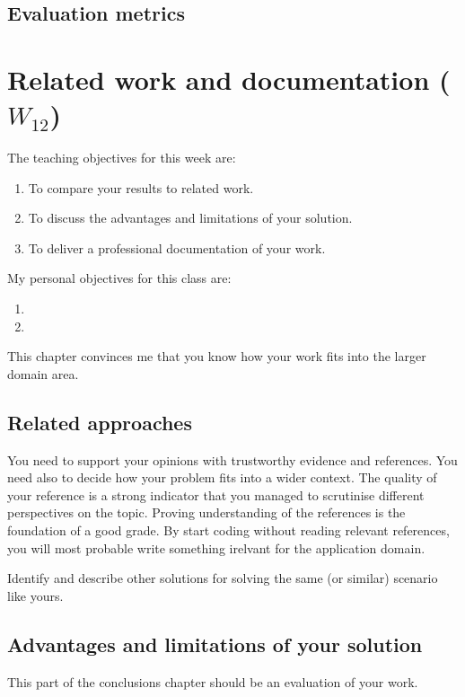 \documentclass[a4paper,12pt]{report}
\begin{document}
\section{Evaluation metrics}



\chapter{Related work and documentation ($W_{12}$)}

The teaching objectives for this week are:
\begin{enumerate}
 \item To compare your results to related work.
\item To discuss the advantages and limitations of your solution.
\item To deliver a professional documentation of your work.
\end{enumerate}

\vspace{0.5cm}

My personal objectives for this class are:
\begin{enumerate}
 \item 
 \item 
\end{enumerate}


This chapter convinces me that you know how your work fits into the larger domain area.



\section{Related approaches}
You need to support your opinions with trustworthy evidence and references.
You need also to decide how your problem fits into a wider context.
The quality of your reference is a strong indicator that you 
managed to scrutinise different perspectives on the topic.
Proving understanding of the references is the foundation of a good grade. 
By start coding without reading relevant references, you will most probable write something irelvant for the application domain.  

Identify and describe other solutions for solving the same (or similar) scenario like yours.

\section{Advantages and limitations of your solution}
This part of the conclusions chapter should be an evaluation of your work. 
\end{document}
